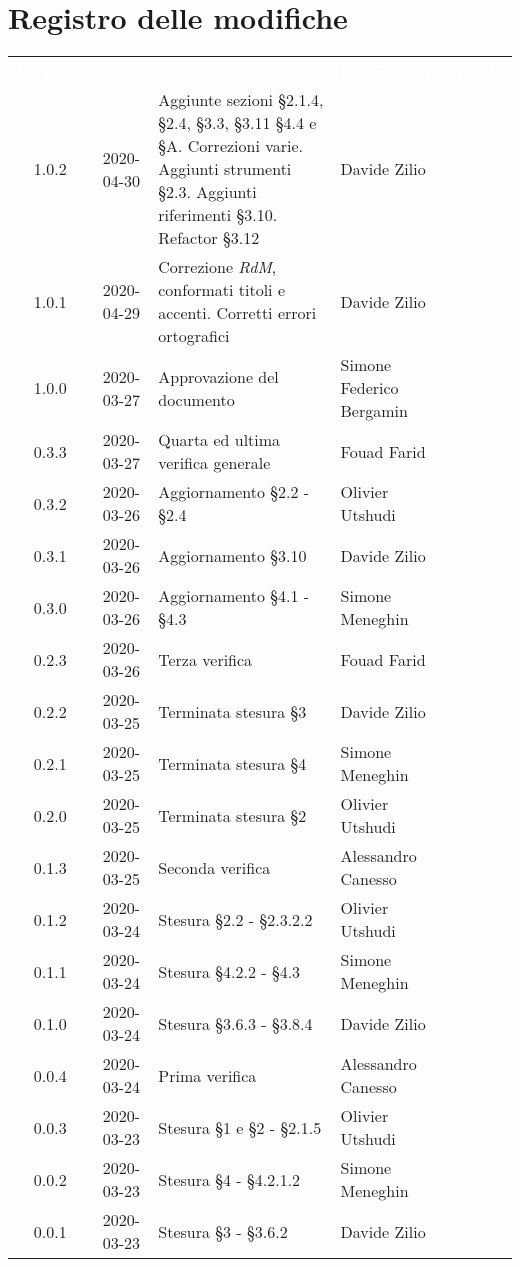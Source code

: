 \section*{Registro delle modifiche}
{
	\centering
	\begin{longtable}{ c c  C{4cm}  C{3cm}  C{3.5cm} }
		\textcolor{white}{\textbf{Versione}} & \textcolor{white}{\textbf{Data}} & \textcolor{white}{\textbf{Descrizione}} & \textcolor{white}{\textbf{Nominativo}} & \textcolor{white}{\textbf{Ruolo}}\\
	1.0.2 & 2020-04-30 & Aggiunte sezioni \S 2.1.4, \S 2.4, \S 3.3, \S 3.11 \S 4.4 e \S A. Correzioni varie. Aggiunti strumenti \S 2.3. Aggiunti riferimenti \S 3.10. Refactor \S 3.12 & Davide Zilio &\adm{} \\
	1.0.1 & 2020-04-29 & Correzione \textit{RdM}, conformati titoli e accenti. Corretti errori ortografici & Davide Zilio &\adm{} \\	
    1.0.0 & 2020-03-27 & Approvazione del documento & Simone Federico Bergamin &\RdP{} \\
    	0.3.3 & 2020-03-27 & Quarta ed ultima verifica generale & Fouad Farid &\ver{}\\
    	0.3.2 & 2020-03-26 & Aggiornamento \S 2.2 - \S 2.4 & Olivier Utshudi &\adm{}\\
		0.3.1 & 2020-03-26 & Aggiornamento \S 3.10 & Davide Zilio &\adm{}\\
		0.3.0 & 2020-03-26 & Aggiornamento \S 4.1 - \S 4.3  & Simone Meneghin &\adm{}\\
		0.2.3 & 2020-03-26 & Terza verifica & Fouad Farid &\ver{}\\
		0.2.2 & 2020-03-25 & Terminata stesura \S 3  & Davide Zilio &\adm{}\\
    	0.2.1 & 2020-03-25 & Terminata stesura \S 4 & Simone Meneghin &\adm{}\\	
   		0.2.0 & 2020-03-25 & Terminata stesura \S 2 & Olivier Utshudi &\adm{}\\
   		0.1.3 & 2020-03-25 & Seconda verifica & Alessandro Canesso &\ver{}\\
		0.1.2 & 2020-03-24 & Stesura \S 2.2 - \S 2.3.2.2 & Olivier Utshudi &\adm{}\\
		0.1.1 & 2020-03-24 & Stesura \S 4.2.2 - \S 4.3 & Simone Meneghin &\adm{}\\		
		0.1.0 & 2020-03-24 & Stesura \S 3.6.3 - \S 3.8.4 & Davide Zilio &\adm{}\\
		0.0.4 & 2020-03-24 & Prima verifica & Alessandro Canesso &\ver{}\\
		0.0.3 & 2020-03-23 & Stesura \S 1 e \S 2 - \S 2.1.5 & Olivier Utshudi &\adm{}\\
		0.0.2 & 2020-03-23 & Stesura \S 4 - \S 4.2.1.2 & Simone Meneghin &\adm{}\\
		0.0.1 & 2020-03-23 & Stesura \S 3 - \S 3.6.2 & Davide Zilio &\adm{}\\		
	\end{longtable}
}
